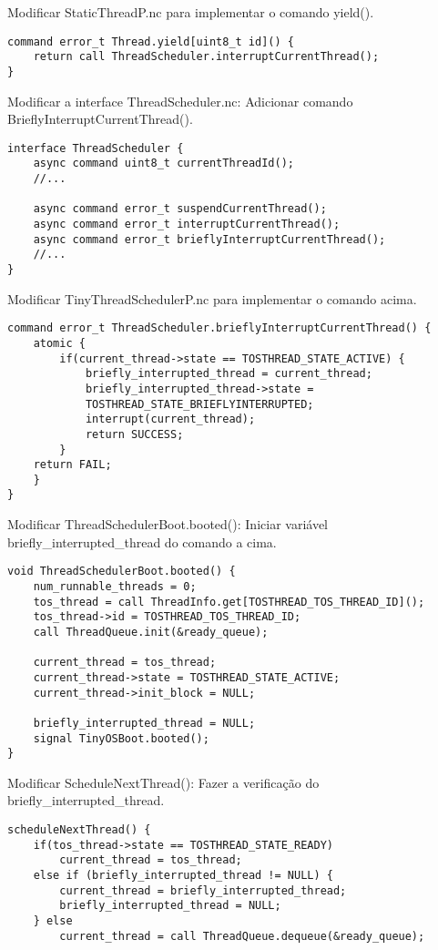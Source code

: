 \begin{description}
\item Modificar StaticThreadP.nc para implementar o comando yield(). 
\begin{lstlisting}
command error_t Thread.yield[uint8_t id]() {
    return call ThreadScheduler.interruptCurrentThread();
}
\end{lstlisting}

\item  Modificar a interface ThreadScheduler.nc: Adicionar comando BrieflyInterruptCurrentThread().
\begin{lstlisting}
interface ThreadScheduler {
    async command uint8_t currentThreadId();
    //...

    async command error_t suspendCurrentThread();
    async command error_t interruptCurrentThread();
    async command error_t brieflyInterruptCurrentThread();
    //...
}
\end{lstlisting}

\item Modificar TinyThreadSchedulerP.nc para implementar o comando acima.
\begin{lstlisting}
command error_t ThreadScheduler.brieflyInterruptCurrentThread() {  
    atomic { 
        if(current_thread->state == TOSTHREAD_STATE_ACTIVE) { 
            briefly_interrupted_thread = current_thread; 
            briefly_interrupted_thread->state =  
            TOSTHREAD_STATE_BRIEFLYINTERRUPTED; 
            interrupt(current_thread); 
            return SUCCESS; 
        } 
    return FAIL; 
    } 
} 
\end{lstlisting}

\item Modificar ThreadSchedulerBoot.booted(): Iniciar variável briefly\_interrupted\_thread do comando a cima.
\begin{lstlisting}
void ThreadSchedulerBoot.booted() {
    num_runnable_threads = 0;
    tos_thread = call ThreadInfo.get[TOSTHREAD_TOS_THREAD_ID]();
    tos_thread->id = TOSTHREAD_TOS_THREAD_ID;
    call ThreadQueue.init(&ready_queue);

    current_thread = tos_thread;
    current_thread->state = TOSTHREAD_STATE_ACTIVE;
    current_thread->init_block = NULL;

    briefly_interrupted_thread = NULL;
    signal TinyOSBoot.booted();
}
\end{lstlisting}

\item Modificar ScheduleNextThread(): Fazer a verificação do briefly\_interrupted\_thread.
\begin{lstlisting}
scheduleNextThread() {
    if(tos_thread->state == TOSTHREAD_STATE_READY)
        current_thread = tos_thread;
    else if (briefly_interrupted_thread != NULL) {
        current_thread = briefly_interrupted_thread;
        briefly_interrupted_thread = NULL;
    } else
        current_thread = call ThreadQueue.dequeue(&ready_queue);


\end{lstlisting}
\end{description}
